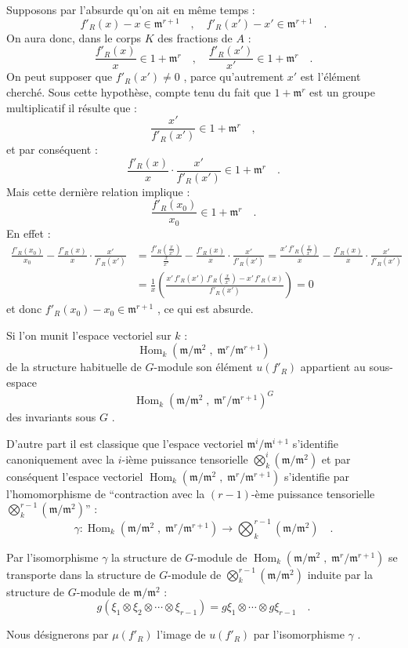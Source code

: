 \documentclass[11pt]{article}
\providecommand{\fm}{\mathfrak{m}}
\DeclareMathOperator{\Hom}{Hom}
\providecommand{\Hom}{\operatorname{Hom}}
\providecommand{\fm}{\mathfrak m}
\providecommand{\Hom}{\operatorname{Hom}}
\begin{document}
Supposons par l'absurde qu'on ait en même temps :
\[
f'_R(x) - x \in \fm^{r+1} \quad , \quad f'_R(x') - x' \in \fm^{r+1} \quad .
\]
On aura donc, dans le corps $K$ des fractions de $A$ :
\[
\frac{f'_R(x)}{x} \in 1 + \fm^r \quad , \quad \frac{f'_R(x')}{x'} \in 1 + \fm^r \quad .
\]
On peut supposer que $f'_R(x') \neq 0$ , parce qu'autrement $x'$ est l'élément cherché. Sous cette hypothèse, compte tenu du fait que $1 + \fm^r$ est un groupe multiplicatif il résulte que :
\[
\frac{x'}{f'_R(x')} \in 1 + \fm^r \quad ,
\]
et par conséquent :
\[
\frac{f'_R(x)}{x} \cdot \frac{x'}{f'_R(x')} \in 1 + \fm^r \quad .
\]
Mais cette dernière relation implique :
\[
\frac{f'_R(x_0)}{x_0} \in 1 + \fm^r \quad .
\]
En effet :
\[
\begin{aligned}
\frac{f'_R(x_0)}{x_0} - \frac{f'_R(x)}{x} \cdot \frac{x'}{f'_R(x')}
&= \frac{f'_R(\frac{x}{x'})}{\frac{x}{x'}} - \frac{f'_R(x)}{x} \cdot \frac{x'}{f'_R(x')}
= \frac{x'\,f'_R(\frac{x}{x'})}{x} - \frac{f'_R(x)}{x} \cdot \frac{x'}{f'_R(x')} \\
&= \frac{1}{x}\left(\frac{x'\,f'_R(x')\,f'_R(\frac{x}{x'}) - x'\,f'_R(x)}{f'_R(x')}\right) = 0
\end{aligned}
\]
et donc $f'_R(x_0) - x_0 \in \fm^{r+1}$ , ce qui est absurde.

Si l'on munit l'espace vectoriel sur $k$ :
\[
\Hom_k(\fm/\fm^2 \; , \; \fm^r/\fm^{r+1})
\]
de la structure habituelle de $G$-module son élément $u(f'_R)$ appartient au sous-espace
\[
\Hom_k(\fm/\fm^2 \; , \; \fm^r/\fm^{r+1})^G
\]
des invariants sous $G$ .

D'autre part il est classique que l'espace vectoriel $\fm^i/\fm^{i+1}$ s'identifie canoniquement avec la $i$-ième puissance tensorielle $\bigotimes_k^i (\fm/\fm^2)$ et par conséquent l'espace vectoriel $\Hom_k(\fm/\fm^2 \; , \; \fm^r/\fm^{r+1})$ s'identifie par l'homomorphisme de ``contraction avec la $(r-1)$-ème puissance tensorielle $\bigotimes_k^{r-1}(\fm/\fm^2)$'' :
\[
\gamma : \Hom_k(\fm/\fm^2 \; , \; \fm^r/\fm^{r+1}) \longrightarrow \bigotimes_k^{r-1}(\fm/\fm^2) \quad .
\]

Par l'isomorphisme $\gamma$ la structure de $G$-module de $\Hom_k(\fm/\fm^2 \; , \; \fm^r/\fm^{r+1})$ se transporte dans la structure de $G$-module de $\bigotimes_k^{r-1}(\fm/\fm^2)$ induite par la structure de $G$-module de $\fm/\fm^2$ :
\[
g(\xi_1 \otimes \xi_2 \otimes \cdots \otimes \xi_{r-1}) = g\xi_1 \otimes \cdots \otimes g\xi_{r-1} \quad .
\]

Nous désignerons par $\mu(f'_R)$ l'image de $u(f'_R)$ par l'isomorphisme $\gamma$ .
\end{document}
